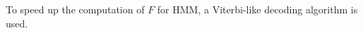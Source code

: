 To speed up the computation of $F$ for HMM, a Viterbi-like decoding algorithm is used.








                  

              

